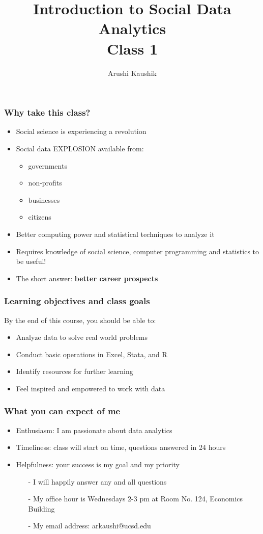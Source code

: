\documentclass[11pt]{beamer}
\title[Class 1]{Introduction to Social Data Analytics \\
\bigskip Class 1}
\author[Kaushik]{Arushi Kaushik}
\institute[UCSD]{Department of Economics \\ UCSD}
\date{}
\begin{document}
\frame{\titlepage}

\begin{frame}
 \frametitle{Why take this class?}
  \begin{itemize}
\item Social science is experiencing a \alert{revolution} \pause
\item Social data \alert{EXPLOSION} available from:
\begin{itemize}
\item governments
\item non-profits
\item businesses
\item citizens 
\end{itemize}\pause
\item Better \alert{computing power} and \alert{statistical} techniques to analyze it
\item Requires knowledge of \alert{social science}, \alert{computer programming} and \alert{statistics} to be useful! 
\pause
\item The short answer: \textbf{better career prospects}
\end{itemize}
\end{frame}

\begin{frame}
\frametitle{Learning objectives and class goals}
By the end of this course, you should be able to:
\begin{itemize}
\item Analyze data to solve \alert{real world problems}
\item Conduct basic operations in \alert{Excel, Stata,} and \alert{R} 
\item Identify resources for \alert{further learning}
\item Feel \alert{inspired} and \alert{empowered} to work with data
\end{itemize}
\end{frame}

\begin{frame}
\frametitle{What you can expect of me}
\begin{itemize}
\item Enthusiasm: I am \alert{passionate} about data analytics \pause
\item Timeliness: class will start \alert{on time}, questions answered in 24 hours \pause
\item Helpfulness: \alert{your success} is my goal and my priority
\begin{itemize}
	\item[-] I will happily answer any and all questions
	\item[-] My office hour is Wednesdays 2-3 pm at Room No. 124, Economics Building
	\item[-] My email address: arkaushi@ucsd.edu
\end{itemize}
\end{itemize}
\end{frame}
\end{document}
